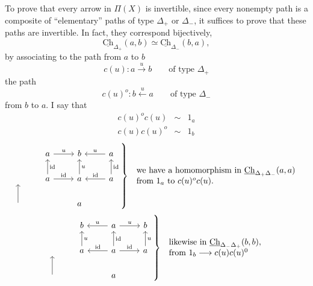 \documentclass[11pt]{article}
\newcommand{\printedpage}[1]{\marginpar{\footnotesize p.~#1}}
\newcommand{\msp}[1]{\marginpar{\footnotesize [#1]}}
\newcommand{\Ch}{\underline{\mathrm{Ch}}}
\begin{document}
\printedpage{42}
\msp{page 63}
To prove that every arrow in $\Pi(X)$ is invertible, since every nonempty path is a composite of ``elementary'' paths of type $\Delta_+$ or $\Delta_-$, it suffices to prove that these paths are invertible. In fact, they correspond bijectively,
\[
\Ch_{\Delta_+}(a,b) \simeq \Ch_{\Delta_-}(b,a),
\]
by associating to the path from $a$ to $b$
\[
c(u) : a \xrightarrow{u} b \qquad \text{of type } \Delta_+
\]
the path
\[
c(u)^o : b \xleftarrow{u} a \qquad \text{of type } \Delta_-
\]
from $b$ to $a$. I say that
\[
\begin{array}{rcl}
c(u)^o c(u) & \sim & 1_a\\
c(u) c(u)^o & \sim & 1_b
\end{array}
\]
\[
\left.
\begin{tikzcd}
 & a \arrow[r, "u"] & b & a \arrow[l, "u"'] \\
 {} & a \arrow[u, "\mathrm{id}"'] \arrow[r, "\mathrm{id}"] & a \arrow[u, "u"'] & a \arrow[u, "\mathrm{id}"'] \arrow[l, "\mathrm{id}"'] \\
 {} \arrow[u] & & a &
\end{tikzcd}
\right\}\
\begin{array}{l}
\text{we have a homomorphism in } \Ch_{\Delta_+\Delta_-}(a,a)\\
\text{from } 1_a \text{ to } c(u)^o c(u).
\end{array}
\]
\[
\left.
\begin{tikzcd}
 & b & a \arrow[l, "u"'] \arrow[r, "u"] & b \\
 {} & a \arrow[u, "u"'] & a \arrow[u, "\mathrm{id}"'] \arrow[l, "\mathrm{id}"'] \arrow[r, "\mathrm{id}"] & a \arrow[u, "u"'] \\
 {} \arrow[u] & & a &
\end{tikzcd}
\right\}\
\begin{array}{l}
\text{likewise in } \Ch_{\Delta_-\Delta_+}(b,b),\\
\text{from } 1_b \longrightarrow c(u)c(u)^0 %
\end{array}
\]
\end{document}
